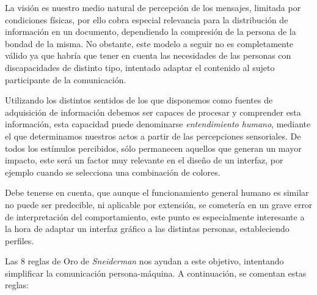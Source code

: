 La visión es nuestro medio natural de percepción de los mensajes, limitada por condiciones físicas, 
por ello cobra especial relevancia para la distribución de información en un documento, 
dependiendo la compresión de la persona de la bondad de la misma. No obstante, este modelo a seguir no es 
completamente válido ya que habría que tener en cuenta las necesidades de las personas con discapacidades de distinto tipo, 
intentado adaptar el contenido al sujeto participante de la comunicación.

Utilizando los distintos sentidos de los que disponemos como fuentes de adquisición de información 
debemos ser capaces de procesar y comprender esta información, esta capacidad puede denominarse 
\textit{entendimiento humano}, mediante el que determinamos nuestros actos a partir de las percepciones 
sensoriales. De todos los estímulos percibidos, sólo permanecen aquellos que generan un mayor impacto, 
este será un factor muy relevante en el diseño de un interfaz, por ejemplo cuando se selecciona una combinación de colores.

Debe tenerse en cuenta, que aunque el funcionamiento general humano es similar no puede ser 
predecible, ni aplicable por extensión, se cometería en un grave error de 
interpretación del comportamiento, este punto es especialmente interesante a la hora de adaptar un interfaz 
gráfico a las distintas personas, estableciendo perfiles.

Las 8 reglas de Oro de \textit{Sneiderman} nos ayudan a este objetivo, intentando simplificar 
la comunicación persona-máquina. A continuación, se comentan estas reglas:


